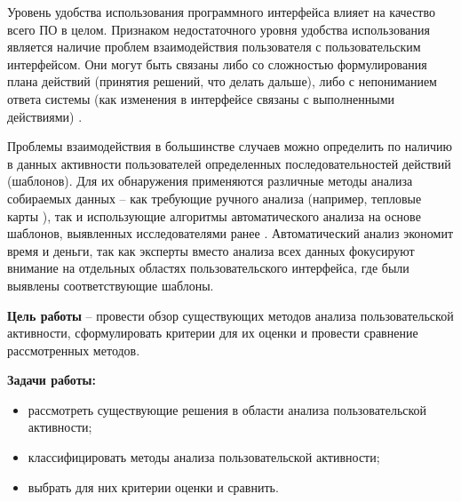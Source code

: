 
Уровень удобства использования программного интерфейса влияет на качество всего ПО в целом. Признаком недостаточного уровня удобства использования является наличие проблем взаимодействия пользователя с пользовательским интерфейсом. Они могут быть связаны либо со сложностью формулирования плана действий (принятия решений, что делать дальше), либо с непониманием ответа системы (как изменения в интерфейсе связаны с выполненными действиями) \cite{1}.

Проблемы взаимодействия в большинстве случаев можно определить по наличию в данных активности пользователей определенных последовательностей действий (шаблонов). Для их обнаружения применяются различные методы анализа собираемых данных – как требующие ручного анализа (например, тепловые карты \cite{2,3}), так и использующие алгоритмы автоматического анализа \cite{1} на основе шаблонов, выявленных исследователями ранее \cite{4, 5, 6}. Автоматический анализ экономит время и деньги, так как эксперты вместо анализа всех данных фокусируют внимание на отдельных областях пользовательского интерфейса,
где были выявлены соответствующие шаблоны.


\textbf{Цель работы} – провести обзор существующих методов анализа пользовательской активности, сформулировать критерии для их оценки и провести сравнение рассмотренных методов.

\textbf{Задачи работы:}
\begin{itemize}
	\item рассмотреть существующие решения в области анализа пользовательской активности;
	\item классифицировать методы анализа пользовательской активности;
	\item выбрать для них критерии оценки и сравнить.
\end{itemize}
